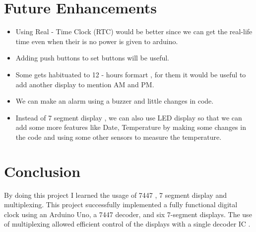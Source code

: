 \documentclass{article}
\begin{document}
\section{Future Enhancements}
\begin{itemize}
\item Using Real - Time Clock (RTC) would be better since we can get the real-life time even when their is no power is given to arduino.
\item Adding push buttons to set buttons will be useful.
\item Some gets habituated to 12 -  hours formart , for them it would be useful to add another display to mention AM and PM.
\item We can make an alarm using a buzzer and little changes in code.
\item Instead of 7 segment display , we can also use LED display so that we can add some more features like Date, Temperature by making some changes in the code and using some other sensors to measure the temperature.
\end{itemize}

\section{Conclusion}

By doing this project I learned the usage of 7447 , 7 segment display and multiplexing. This project successfully implemented a fully functional digital clock using an Arduino Uno, a 7447 decoder, and six 7-segment displays. The use of multiplexing allowed efficient control of the displays with a single decoder IC .
\end{document}
